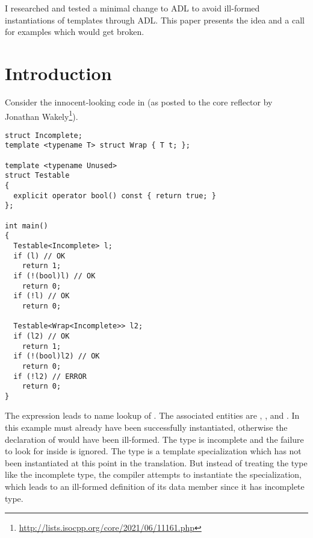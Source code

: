 \newcommand\wgTitle{A minimal ADL restriction to avoid ill-formed template instantiation}
\newcommand\wgName{Matthias Kretz <m.kretz@gsi.de>}
\newcommand\wgDocumentNumber{DMADLR0}
\newcommand\wgGroup{EWG}
\newcommand\wgTarget{\CC{}26}

\usepackage{mymacros}
\usepackage{wg21}
\usepackage{changelog}
\usepackage{underscore}



\newcommand\wglink[1]{\href{https://wg21.link/#1}{#1}}
\newcommand\notyetinstantiated{not\hyp{}yet\hyp{}instantiated\hyp{}templates\xspace}


\begin{wgTitlepage}
  I researched and tested a minimal change to ADL to avoid ill-formed instantiations of 
  templates through ADL. This paper presents the idea and a call for examples which would 
  get broken.
\end{wgTitlepage}

\pagestyle{scrheadings}

%

%

\section{Introduction}

Consider the innocent-looking code in  (as posted to the core reflector by 
Jonathan Wakely\footnote{\url{http://lists.isocpp.org/core/2021/06/11161.php}}).
\begin{lstlisting}[style=Vc,float,label=lst:example1,caption={
Ill-formed instantiation of \type{Wrap<Incomplete>} because of ADL
}]
struct Incomplete;
template <typename T> struct Wrap { T t; };

template <typename Unused>
struct Testable
{
  explicit operator bool() const { return true; }
};

int main()
{
  Testable<Incomplete> l;
  if (l) // OK
    return 1;
  if (!(bool)l) // OK
    return 0;
  if (!l) // OK
    return 0;

  Testable<Wrap<Incomplete>> l2;
  if (l2) // OK
    return 1;
  if (!(bool)l2) // OK
    return 0;
  if (!l2) // ERROR
    return 0;
}
\end{lstlisting}

The expression  leads to name lookup of . The associated 
entities are , , and 
.
In this example  must already have been successfully 
instantiated, otherwise the declaration of  would have been ill-formed.
The type  is incomplete and the failure to look for  
inside  is ignored.
The type  is a template specialization which has not been 
instantiated at this point in the translation. But instead of treating the type like the 
incomplete  type, the compiler attempts to instantiate the 
specialization, which leads to an ill-formed definition of its data member since it has 
incomplete type.

